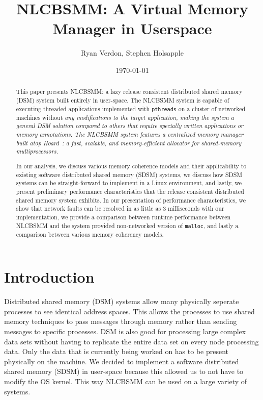 \documentclass[10pt,conference]{IEEEtran}
\begin{document}
\title{\vfill NLCBSMM: A Virtual Memory Manager in Userspace} 
\author{Ryan Verdon, Stephen Holsapple}
\date{\today}
\maketitle

\def \projname {NLCBSMM}
\newtheorem{definition}{Definition}[section]
\newtheorem{condition}{Condition}[section]

\begin{abstract}
This paper presents \projname{}: a lazy release consistent distributed shared memory (DSM) system built entirely in user-space.  The \projname{} system is capable of executing threaded applications implemented with \verb,pthreads, on a cluster of networked machines without \em any \em modifications to the target application, making the system a general DSM solution compared to others that require specially written applications or memory annotations.  The \projname{} system features a centralized memory manager~\cite{Li:1989:MCS:75104.75105} built atop Hoard~\cite{Berger:1999:HFS:899944, Berger:2000:HSM:356989.357000}: a fast, scalable, and memory-efficient allocator for shared-memory multiprocessors.

In our analysis, we discuss various memory coherence models and their applicability to existing software distributed shared memory (SDSM) systems, we discuss how SDSM systems can be straight-forward to implement in a Linux environment, and lastly, we present preliminary performance characteristics that the release consistent distributed shared memory system exhibits.  In our presentation of performance characteristics, we show that network faults can be resolved in as little as 3 milliseconds with our implementation, we provide a comparison between runtime performance between \projname{} and the system provided non-networked version of \verb,malloc,, and lastly a comparison between various memory coherency models.

\end{abstract}

\section{Introduction}

Distributed shared memory (DSM) systems allow many physically seperate processes to see identical address spaces.  This allows the processes to use shared memory techniques to pass messages through memory rather than sending messages to specific processes.  DSM is also good for processing large complex data sets without having to replicate the entire data set on every node processing data.  Only the data that is currently being worked on has to be present physically on the machine.  We decided to implement a software distributed shared memory (SDSM) in user-space because this allowed us to not have to modify the OS kernel.  This way \projname{} can be used on a large variety of systems.  
\end{document}
